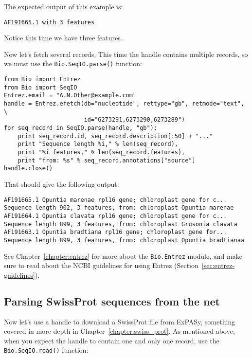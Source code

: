 \documentclass{report}
\begin{document}
\noindent The expected output of this example is:

\begin{verbatim}
AF191665.1 with 3 features
\end{verbatim}

\noindent Notice this time we have three features.

Now let's fetch several records.  This time the handle contains multiple records,
so we must use the \verb|Bio.SeqIO.parse()| function:

\begin{verbatim}
from Bio import Entrez
from Bio import SeqIO
Entrez.email = "A.N.Other@example.com"
handle = Entrez.efetch(db="nucleotide", rettype="gb", retmode="text", \
                       id="6273291,6273290,6273289")
for seq_record in SeqIO.parse(handle, "gb"):
    print seq_record.id, seq_record.description[:50] + "..."
    print "Sequence length %i," % len(seq_record),
    print "%i features," % len(seq_record.features),
    print "from: %s" % seq_record.annotations["source"]
handle.close()
\end{verbatim}

\noindent That should give the following output:

\begin{verbatim}
AF191665.1 Opuntia marenae rpl16 gene; chloroplast gene for c...
Sequence length 902, 3 features, from: chloroplast Opuntia marenae
AF191664.1 Opuntia clavata rpl16 gene; chloroplast gene for c...
Sequence length 899, 3 features, from: chloroplast Grusonia clavata
AF191663.1 Opuntia bradtiana rpl16 gene; chloroplast gene for...
Sequence length 899, 3 features, from: chloroplast Opuntia bradtianaa
\end{verbatim}

See Chapter~\ref{chapter:entrez} for more about the \verb|Bio.Entrez| module, and make sure to read about the NCBI guidelines for using Entrez (Section~\ref{sec:entrez-guidelines}).

\subsection{Parsing SwissProt sequences from the net}
\label{sec:SeqIO_ExPASy_and_SwissProt}
Now let's use a handle to download a SwissProt file from ExPASy,
something covered in more depth in Chapter~\ref{chapter:swiss_prot}.
As mentioned above, when you expect the handle to contain one and only one record,
use the \verb|Bio.SeqIO.read()| function:
\end{document}
